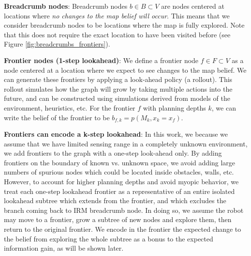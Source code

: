 \documentclass{article}
\newcommand{\ph}[1]{{\textbf{#1}:}} %
\begin{document}
\ph{Breadcrumb nodes}
Breadcrumb nodes $b\in B \subset V$ are nodes centered at locations where \textit{no changes to the map belief will occur}.  This means that we consider breadcrumb nodes to be locations where the map is fully explored.  Note that this does not require the exact location to have been visited before (see Figure \ref{fig:breadcrumbs_frontiers}). 

\ph{Frontier nodes (1-step lookahead)}
We define a frontier node $f\in F\subset V$ as a node centered at a location where we expect to see changes to the map belief.  We can generate these frontiers by applying a look-ahead policy (a rollout).  This rollout simulates how the graph will grow by taking multiple actions into the future, and can be constructed using simulations derived from models of the environment, heuristics, etc.  For the frontier $f$ with planning depths $k$, we can write the belief of the frontier to be $b_{f,k} = p(M_k, x_k = x_f)$.

\ph{Frontiers can encode a k-step lookahead}
In this work, we because we assume that we have limited sensing range in a completely unknown environment, we add frontiers to the graph with a one-step look-ahead only.  By adding frontiers on the boundary of known vs. unknown space, we avoid adding large numbers of spurious nodes which could be located inside obstacles, walls, etc.  However, to account for higher planning depths and avoid myopic behavior, we treat each one-step lookahead frontier as a representative of an entire isolated lookahead  subtree which extends from the frontier, and which excludes the branch coming back to IRM breadcrumb node.  In doing so, we assume the robot may move to a frontier, grow a subtree of new nodes and explore them, then return to the original frontier.  We encode in the frontier the expected change to the belief from exploring the whole subtree as a bonus to the expected information gain, as will be shown later.
\end{document}
